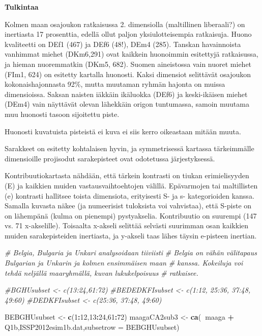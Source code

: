 \documentclass[
  finnish,
]{book}
\newenvironment{Shaded}{\begin{snugshade}}{\end{snugshade}}
\newcommand{\CommentTok}[1]{\textcolor[rgb]{0.56,0.35,0.01}{\textit{#1}}}
\newcommand{\DataTypeTok}[1]{\textcolor[rgb]{0.13,0.29,0.53}{#1}}
\newcommand{\DecValTok}[1]{\textcolor[rgb]{0.00,0.00,0.81}{#1}}
\newcommand{\KeywordTok}[1]{\textcolor[rgb]{0.13,0.29,0.53}{\textbf{#1}}}
\newcommand{\NormalTok}[1]{#1}
\newcommand{\OperatorTok}[1]{\textcolor[rgb]{0.81,0.36,0.00}{\textbf{#1}}}
\newcommand{\StringTok}[1]{\textcolor[rgb]{0.31,0.60,0.02}{#1}}
\begin{document}
\textbf{Tulkintaa}

Kolmen maan osajoukon ratkaisussa 2. dimensiolla (maltillinen
liberaali?) on inertiasta 17 prosenttia, edellä ollut paljon
yksiulotteisempia ratkaisuja. Huono kvaliteetti on DEf1 (467) ja DEf6
(48!), DEm4 (285). Tanskan havainnoista vanhimmat miehet (DKm6,291) ovat
kaikkein huonoimmin esitettyjä ratkaisussa, ja hieman nuoremmatkin
(DKm5, 682). Suomen aineistossa vain nuoret miehet (FIm1, 624) on
esitetty kartalla huonosti. Kaksi dimensiot selittävät osajoukon
kokonaishajonnasta 92\%, mutta muutaman ryhmän hajonta on muissa
dimensioissa. Saksan naisten iäkkäin ikäluokka (DEf6) ja keski-ikäisen
miehet (DEm4) vain näyttävät olevan lähekkäin origon tuntumassa, samoin
muutama muu huonosti tasoon sijoitettu piste.

Huonosti kuvatuista pisteistä ei kuva ei siis kerro oikeastaan mitään
muuta.

Sarakkeet on esitetty kohtalaisen hyvin, ja symmetrisessä kartassa
tärkeimmälle dimensioille projisodut sarakepisteet ovat odotetussa
järjestyksessä.

Kontribuutiokartasta nähdään, että tärkein kontrasti on tiukan
erimielisyyden (E) ja kaikkien muiden vastausvaihtoehtojen välillä.
Epävarmojen tai maltillisten (e) kontrasti hallitsee toista dimensiota,
erityisesti S- ja s- kategorioiden kanssa. Samalla kuvasta näkee (ja
numeerisist tuloksista voi vahvistaa), että S-piste on on lähempänä
(kulma on pienempi) pystyakselia. Kontribuutio on suurempi (147 vs. 71
x-akselille). Toisaalta x-akseli selittää selvästi suurimman osan
kaikkien muiden sarakepisteiden inertiasta, ja y-akseli taas lähes
täysin e-pisteen inertian.

\begin{Shaded}
\begin{Highlighting}[]
\CommentTok{# Belgia, Bulgaria ja Unkari analysoidaan tiiviisti}
\CommentTok{# Belgia on vähän välitapaus Bulgarian ja Unkarin ja kolmen ensimmäisen maan}
\CommentTok{# kanssa. Kokeiluja voi tehdä neljällä maaryhmällä, kuvan lukukelpoisuus}
\CommentTok{# ratkaisee.}

\CommentTok{#BGHUsubset <- c(13:24,61:72)}
\CommentTok{#BEDEDKFIsubset <- c(1:12, 25:36, 37:48, 49:60)}
\CommentTok{#DEDKFIsubset <- c(25:36, 37:48, 49:60)}

\NormalTok{BEBGHUsubset <-}\StringTok{ }\KeywordTok{c}\NormalTok{(}\DecValTok{1}\OperatorTok{:}\DecValTok{12}\NormalTok{,}\DecValTok{13}\OperatorTok{:}\DecValTok{24}\NormalTok{,}\DecValTok{61}\OperatorTok{:}\DecValTok{72}\NormalTok{)}
\NormalTok{maagaCA2sub3 <-}\StringTok{ }\KeywordTok{ca}\NormalTok{(}\OperatorTok{~}\NormalTok{maaga }\OperatorTok{+}\StringTok{ }\NormalTok{Q1b,ISSP2012esim1b.dat,}\DataTypeTok{subsetrow =}\NormalTok{ BEBGHUsubset)}
\end{Highlighting}
\end{Shaded}
\end{document}
